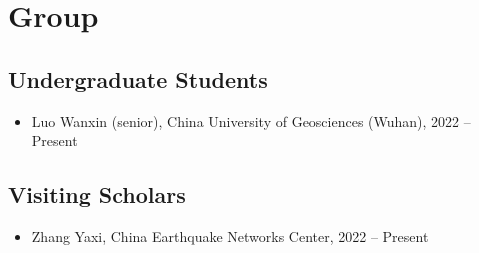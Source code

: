 \section{Group}

\subsection{Undergraduate Students}
\begin{itemize}
\item Luo Wanxin (senior), China University of Geosciences (Wuhan), 2022 -- Present
\end{itemize}

\subsection{Visiting Scholars}
\begin{itemize}
\item Zhang Yaxi, China Earthquake Networks Center, 2022 -- Present
\end{itemize}
